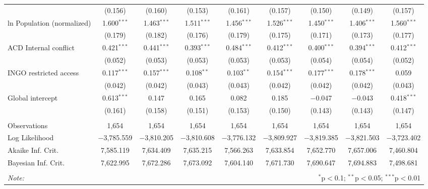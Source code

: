 \begin{sidewaystable}[!htbp]
\begin{tabular}{@{\extracolsep{5pt}}lcccccccc}
  & (0.156) & (0.160) & (0.153) & (0.161) & (0.157) & (0.150) & (0.149) & (0.157) \\ 
  ln Population (normalized) & 1.600$^{***}$ & 1.463$^{***}$ & 1.511$^{***}$ & 1.456$^{***}$ & 1.526$^{***}$ & 1.450$^{***}$ & 1.406$^{***}$ & 1.560$^{***}$ \\ 
  & (0.179) & (0.182) & (0.176) & (0.179) & (0.175) & (0.171) & (0.173) & (0.177) \\ 
  ACD Internal conflict & 0.421$^{***}$ & 0.441$^{***}$ & 0.393$^{***}$ & 0.484$^{***}$ & 0.412$^{***}$ & 0.400$^{***}$ & 0.394$^{***}$ & 0.412$^{***}$ \\ 
  & (0.052) & (0.053) & (0.053) & (0.053) & (0.053) & (0.054) & (0.054) & (0.052) \\ 
  INGO restricted access & 0.117$^{***}$ & 0.157$^{***}$ & 0.108$^{**}$ & 0.103$^{**}$ & 0.154$^{***}$ & 0.177$^{***}$ & 0.178$^{***}$ & 0.059 \\ 
  & (0.042) & (0.042) & (0.043) & (0.043) & (0.042) & (0.042) & (0.042) & (0.043) \\ 
  Global intercept & 0.613$^{***}$ & 0.147 & 0.165 & 0.082 & 0.185 & $-$0.047 & $-$0.043 & 0.418$^{***}$ \\ 
  & (0.161) & (0.158) & (0.151) & (0.153) & (0.150) & (0.143) & (0.143) & (0.147) \\ 
 \hline \\[-1.8ex] 
Observations & 1,654 & 1,654 & 1,654 & 1,654 & 1,654 & 1,654 & 1,654 & 1,654 \\ 
Log Likelihood & $-$3,785.559 & $-$3,810.205 & $-$3,810.608 & $-$3,776.132 & $-$3,809.927 & $-$3,819.385 & $-$3,821.503 & $-$3,723.402 \\ 
Akaike Inf. Crit. & 7,585.119 & 7,634.409 & 7,635.215 & 7,566.263 & 7,633.854 & 7,652.770 & 7,657.006 & 7,460.804 \\ 
Bayesian Inf. Crit. & 7,622.995 & 7,672.286 & 7,673.092 & 7,604.140 & 7,671.730 & 7,690.647 & 7,694.883 & 7,498.681 \\ 
\hline 
\hline \\[-1.8ex] 
\textit{Note:}  & \multicolumn{8}{r}{$^{*}$p$<$0.1; $^{**}$p$<$0.05; $^{***}$p$<$0.01} \\ 
\end{tabular} 
\end{sidewaystable} 
